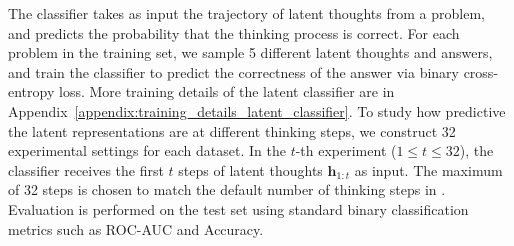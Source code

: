 \documentclass{article} %
\begin{document}
The classifier takes as input the trajectory of latent thoughts from a problem, and predicts the probability that the thinking process is correct.
%
For each problem in the training set, we sample 5 different latent thoughts and answers, and train the classifier to predict the correctness of the answer via binary cross-entropy loss. More training details of the latent classifier are in Appendix~\ref{appendix:training_details_latent_classifier}. To study how predictive the latent representations are at different thinking steps, we construct 32 experimental settings for each dataset. In the $t$-th experiment ($1{\leq}t{\leq}32$), the classifier receives the first $t$ steps of latent thoughts $\mathbf{h}_{1:t}$ as input. The maximum of 32 steps is chosen to match the default number of thinking steps in \LRLM. Evaluation is performed on the test set using standard binary classification metrics such as ROC-AUC and Accuracy.
%
\end{document}
